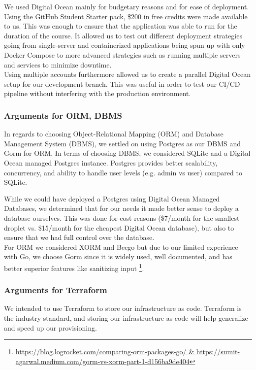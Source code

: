 We used Digital Ocean mainly for budgetary reasons and for ease of deployment. Using the GitHub Student Starter pack, \$200 in free credits were made available to us. This was enough to ensure that the application 
was able to run for the duration of the course. It allowed us to test out different deployment strategies going from single-server and containerized applications being spun up with only Docker Compose to more advanced strategies such as running multiple servers and services to minimize downtime.\\

Using multiple accounts furthermore allowed us to create a parallel Digital Ocean setup for our development branch.
This was useful in order to test our CI/CD pipeline without interfering with the production environment.

\subsubsection{Arguments for ORM, DBMS}
In regards to choosing Object-Relational Mapping (ORM) and Database Management System (DBMS), we settled on using Postgres as our DBMS and Gorm for ORM. In terms of choosing DBMS, we considered SQLite and a Digital Ocean managed Postgres instance. Postgres provides better scalability, concurrency, and ability
to handle user levels (e.g. admin vs user) compared to SQLite.

While we could have deployed a Postgres using Digital Ocean Managed Databases, we determined that for our needs it made 
better sense to deploy a database ourselves. This was done for cost reasons (\$7/month for the smallest droplet vs. \$15/month 
for the cheapest Digital Ocean database), but also to ensure that we had full control over the database.\\

For ORM we considered XORM and Beego but due to our limited experience with Go, we choose Gorm 
since it is widely used, well documented, and has better superior features like sanitizing input \footnote{\url{https://blog.logrocket.com/comparing-orm-packages-go/ & https://sumit-agarwal.medium.com/gorm-vs-xorm-part-1-d156ba9de404}}.

\subsubsection{Arguments for Terraform}
We intended to use Terraform to store our infrastructure as code. Terraform is the industry standard, and storing our infrastructure as code will help generalize and speed up our provisioning. 

